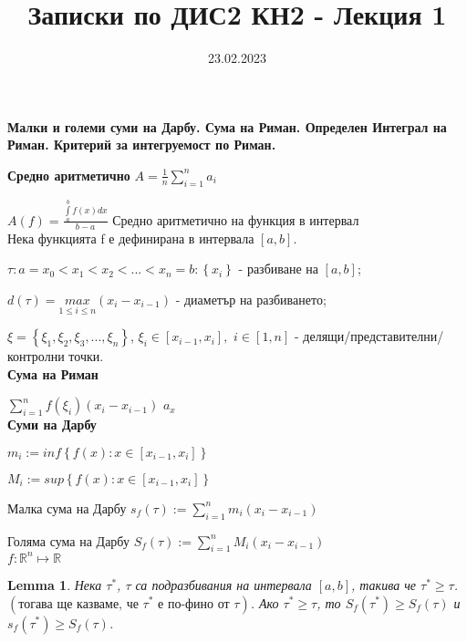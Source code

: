 \documentclass[12pt]{article}
\newtheorem{lemma}{Lemma}
\begin{document}
	\color{white}
	\pagecolor{darkgray}
	\title{Записки по ДИС2 КН2 - Лекция 1}
	\date{23.02.2023}
	\maketitle
	\begin{center}
		\Large
		\textbf{Малки и големи суми на Дарбу. Сума на Риман. Определен Интеграл на Риман. Критерий за интегруемост по Риман.}
	\end{center}
	\textbf{Средно аритметично}
	$A=\frac{1}{n}\sum _{i=1}^{n}{a}_{i}$
	
	
	$A\left(f\right)=\frac{\underset{a}{\overset{b}{\int }}f\left(x\right)dx}{b-a} $ Средно аритметично на функция в интервал
	\\
	
	Нека функцията f е дефинирана в интервала $\left[a, b\right]$.
	
	$\tau : a=x_{0}<x_{1}<x_{2}<...<x_{n}=b : \left\{x_{i}\right\}$ - разбиване на $\left[a, b\right]$;
	
	$d\left(\tau\right)=\underset{1\leq i\leq n}{max}\left(x_{i} - x_{i-1}\right)$ - диаметър на разбиването;
	
	$\xi = \left\{\xi_{1}, \xi_{2}, \xi_{3}, ..., \xi _{n}\right\}$, $\xi_{i} \in \left[x_{i-1}, x_{i}\right],$ $i \in \left[1, n\right]$ - делящи/представителни/контролни точки.
	\\ 
	
	\textbf{Сума на Риман}
	
	$\sum _{i=1}^{n} f\left(\xi _{i}\right)\left(x_{i} - x_{i-1}\right)$
	$a_{x}$
	\\
	
	\textbf{Суми на Дарбу}
	
	$m_{i} := inf\left\{f\left(x\right): x\in \left[x_{i-1}, x_{i}\right]\right\}$
	
	$M_{i} := sup\left\{f\left(x\right): x\in \left[x_{i-1}, x_{i}\right]\right\}$
	
	
	Малка сума на Дарбу 
	$s_{f}\left(\tau\right) := \sum _{i=1}^{n} m_{i}\left(x_{i}-x_{i-1}\right)$
	
	Голяма сума на Дарбу
	$S_{f}\left(\tau\right) := \sum _{i=1}^{n} M_{i}\left(x_{i}-x_{i-1}\right)$
	\\
	
	$f: \mathbb{R}^{n} \mapsto \mathbb{R}$
	\begin{lemma}
		Нека $\tau^{*}$, $\tau$ са подразбивания на интервала $\left[a, b\right]$, такива че  $\tau^{*} \geq \tau$. 
		$\left(\text{тогава ще казваме, че }  \tau^{*} \textbf{ е по-фино от } \tau\right)$. 
		Ако $\tau^{*} \geq \tau$, то $S_{f}\left(\tau^{*}\right) \geq S_{f}\left(\tau\right)$ и $s_{f}\left(\tau^{*}\right) \geq S_{f}\left(\tau\right)$.
		\\
	\end{lemma}
	
\end{document}
